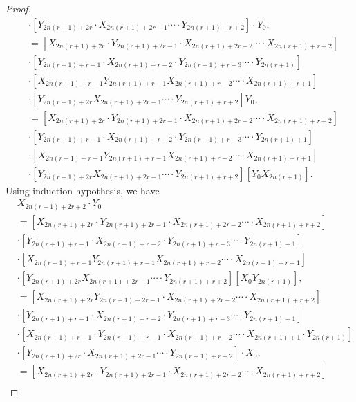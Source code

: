 \begin{proof}
\begin{align*}
&\cdot\left[Y_{2n(r+1)+2r}\cdot X_{2n(r+1)+2r-1}\cdots\cdot Y_{2n(r+1)+r+2}\right]\cdot Y_{0},\\
&=\left[X_{2n(r+1)+2r}\cdot Y_{2n(r+1)+2r-1}\cdot X_{2n(r+1)+2r-2}\cdots\cdot X_{2n(r+1)+r+2}\right]\\
&\cdot\left[Y_{2n(r+1)+r-1}\cdot X_{2n(r+1)+r-2}\cdot Y_{2n(r+1)+r-3}\cdots\cdot Y_{2n(r+1)}\right]\\
&\cdot\left[X_{2n(r+1)+r-1} Y_{2n(r+1)+r-1} X_{2n(r+1)+r-2}\cdots\cdot X_{2n(r+1)+r+1}\right]\\
&\cdot\left[Y_{2n(r+1)+2r} X_{2n(r+1)+2r-1}\cdots\cdot Y_{2n(r+1)+r+2}\right] Y_{0},\\
&=[X_{2n(r+1)+2r}\cdot Y_{2n(r+1)+2r-1}\cdot X_{2n(r+1)+2r-2}\cdots\cdot X_{2n(r+1)+r+2}]\\
&\cdot\left[Y_{2n(r+1)+r-1}\cdot X_{2n(r+1)+r-2}\cdot Y_{2n(r+1)+r-3}\cdots\cdot Y_{2n(r+1)+1}\right]\\
&\cdot\left[X_{2n(r+1)+r-1} Y_{2n(r+1)+r-1} X_{2n(r+1)+r-2}\cdots\cdot X_{2n(r+1)+r+1}\right]\\&\cdot\left[Y_{2n(r+1)+2r} X_{2n(r+1)+2r-1}\cdots\cdot Y_{2n(r+1)+r+2}\right] \left[Y_{0} X_{2n(r+1)}\right].
\end{align*}
Using induction hypothesis, we have
\begin{align*}
&X_{2n(r+1)+2r+2}\cdot Y_{0}\\&=\left[X_{2n(r+1)+2r}\cdot Y_{2n(r+1)+2r-1}\cdot X_{2n(r+1)+2r-2}\cdots\cdot X_{2n(r+1)+r+2}\right]\\
&\cdot\left[Y_{2n(r+1)+r-1}\cdot X_{2n(r+1)+r-2}\cdot Y_{2n(r+1)+r-3}\cdots\cdot Y_{2n(r+1)+1}\right]\\
&\cdot\left[X_{2n(r+1)+r-1} Y_{2n(r+1)+r-1} X_{2n(r+1)+r-2}\cdots\cdot X_{2n(r+1)+r+1}\right]\\&\cdot\left[Y_{2n(r+1)+2r}X_{2n(r+1)+2r-1}\cdots\cdot Y_{2n(r+1)+r+2}\right] \left[X_{0} Y_{2n(r+1)}\right],\\
&=\left[X_{2n(r+1)+2r} Y_{2n(r+1)+2r-1}\cdot X_{2n(r+1)+2r-2}\cdots\cdot X_{2n(r+1)+r+2}\right]\\
&\cdot\left[Y_{2n(r+1)+r-1}\cdot X_{2n(r+1)+r-2}\cdot Y_{2n(r+1)+r-3}\cdots\cdot Y_{2n(r+1)+1}\right]\\
&\cdot\left[X_{2n(r+1)+r-1}\cdot Y_{2n(r+1)+r-1}\cdot X_{2n(r+1)+r-2}\cdots\cdot X_{2n(r+1)+1}\cdot Y_{2n(r+1)}\right]\\
&\cdot\left[Y_{2n(r+1)+2r}\cdot X_{2n(r+1)+2r-1}\cdots\cdot Y_{2n(r+1)+r+2}\right]\cdot X_{0},\\
&=\left[X_{2n(r+1)+2r}\cdot Y_{2n(r+1)+2r-1}\cdot X_{2n(r+1)+2r-2}\cdots\cdot X_{2n(r+1)+r+2}\right]\\

\end{align*}
\end{proof}
